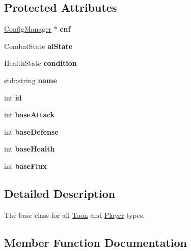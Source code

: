 \subsection*{Protected Attributes}
\begin{DoxyCompactItemize}
\item 
\mbox{\label{classActor_ad8a8c1ffec1bd95560bfa4a85d0cc057}} 
\mbox{\hyperlink{classConfigManager}{Config\+Manager}} $\ast$ {\bfseries cnf}
\item 
\mbox{\label{classActor_a5e0fd27e191f60bd9f4a7bbe27d65a3a}} 
Combat\+State {\bfseries ai\+State}
\item 
\mbox{\label{classActor_af5807d0cf4ed92c7f0d324d5e7940b36}} 
Health\+State {\bfseries condition}
\item 
\mbox{\label{classActor_ae99855a0b1eb2cb0ff78eb32e98e487f}} 
std\+::string {\bfseries name}
\item 
\mbox{\label{classActor_a0d2b93f5baefded4573b9f89aa5bda9a}} 
int {\bfseries id}
\item 
\mbox{\label{classActor_a60ebb0a994dbaa1f6e6f3d96faaabcec}} 
int {\bfseries base\+Attack}
\item 
\mbox{\label{classActor_a0ad19cf932aa7e2fae32264271c2d2bf}} 
int {\bfseries base\+Defense}
\item 
\mbox{\label{classActor_abef2883e3d1e88a29c64123983e7c605}} 
int {\bfseries base\+Health}
\item 
\mbox{\label{classActor_ae696ae51f2ab291fda2473ebacc89b8c}} 
int {\bfseries base\+Flux}
\end{DoxyCompactItemize}


\subsection{Detailed Description}
The base class for all \mbox{\hyperlink{classToon}{Toon}} and \mbox{\hyperlink{classPlayer}{Player}} types. 

\subsection{Member Function Documentation}
\mbox{\label{classActor_a10f4cbdafcc6aea7d3a9a4cfa78ef15f}} 

